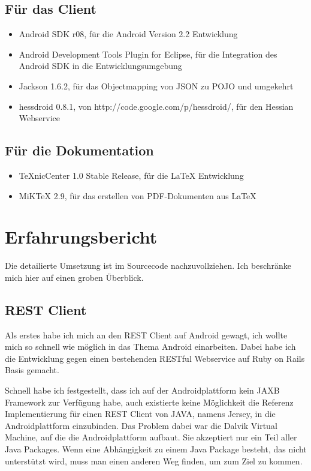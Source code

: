 \documentclass[abstracton, listof=totocnumbered,
bibliography=totocnumbered]{scrreprt}
\begin{document}
  \subsection{Für das Client}
  
  \begin{itemize}
    \item Android SDK r08, für die Android Version 2.2 Entwicklung
    \item Android Development Tools Plugin for Eclipse, für die Integration des
    Android SDK in die Entwicklungsumgebung
    \item Jackson 1.6.2, für das Objectmapping von \ac{JSON} zu \ac{POJO} und
    umgekehrt
    \item hessdroid 0.8.1, von http://code.google.com/p/hessdroid/, für den
    Hessian Webservice
  \end{itemize}
  
  \subsection{Für die Dokumentation}
  
  \begin{itemize}
    \item TeXnicCenter 1.0 Stable Release, für die \LaTeX{} Entwicklung
    \item MiKTeX 2.9, für das erstellen von PDF-Dokumenten aus \LaTeX{} 
  \end{itemize}
  
  \section{Erfahrungsbericht}
  
  Die detailierte Umsetzung ist im Sourcecode nachzuvollziehen. Ich beschränke
  mich hier auf einen groben Überblick.
  
  \subsection{REST Client}
  
  Als erstes habe ich mich an den REST Client auf Android gewagt, ich wollte
  mich so schnell wie möglich in das Thema Android einarbeiten. Dabei habe ich
  die Entwicklung gegen einen bestehenden RESTful Webservice auf Ruby on Rails
  Basis gemacht. 
  
  Schnell habe ich festgestellt, dass ich auf der Androidplattform kein JAXB
  Framework zur Verfügung habe, auch existierte keine Möglichkeit die Referenz
  Implementierung für einen REST Client von JAVA, namens Jersey, in die
  Androidplattform einzubinden. Das Problem dabei war die Dalvik Virtual
  Machine, auf die die Androidplattform aufbaut. Sie akzeptiert nur ein Teil
  aller Java Packages. Wenn eine Abhängigkeit zu einem Java Package besteht, das
  nicht unterstützt wird, muss man einen anderen Weg finden, um zum Ziel zu
  kommen.
  
\end{document}
